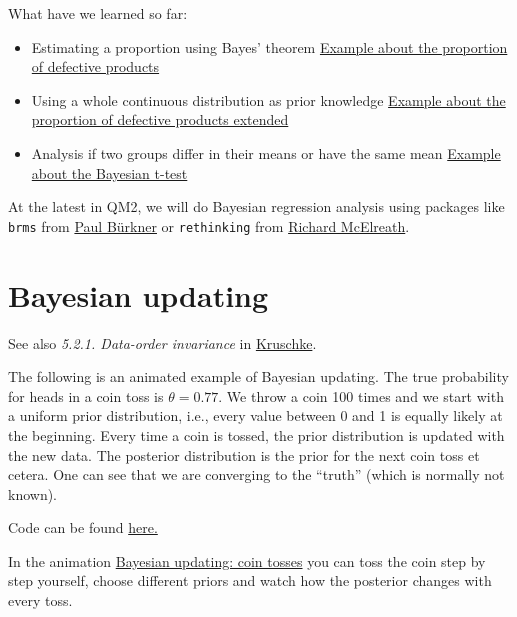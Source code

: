 \documentclass[
]{book}
\begin{document}
What have we learned so far:

\begin{itemize}
\item
  Estimating a proportion using Bayes' theorem \hyperref[example_defective_products]{Example about the proportion of defective products}
\item
  Using a whole continuous distribution as prior knowledge \hyperref[example_defective_products_extended]{Example about the proportion of defective products extended}
\item
  Analysis if two groups differ in their means or have the same mean \hyperref[bayesian_t_test]{Example about the Bayesian t-test}
\end{itemize}

At the latest in QM2, we will do Bayesian regression analysis using packages like \texttt{brms} from
\href{https://www.tu-dortmund.de/universitaet/neuberufene-professorinnen/prof-paul-christian-buerkner/}{Paul Bürkner} or
\texttt{rethinking} from \href{https://www.eva.mpg.de/ecology/staff/richard-mcelreath/}{Richard McElreath}.

\section{Bayesian updating}\label{bayesian-updating}

See also \emph{5.2.1. Data-order invariance} in \href{https://nyu-cdsc.github.io/learningr/assets/kruschke_bayesian_in_R.pdf}{Kruschke}.

The following is an animated example of Bayesian updating.
The true probability for heads in a coin toss is \(\theta = 0.77\).
We throw a coin 100 times and we start with a uniform prior distribution, i.e.,
every value between 0 and 1 is equally likely at the beginning.
Every time a coin is tossed, the prior distribution is updated with the new data.
The posterior distribution is the prior for the next coin toss et cetera.
One can see that we are converging to the ``truth'' (which is normally not known).

Code can be found \href{https://github.com/jdegenfellner/Script_QM1_ZHAW/blob/main/R_codes_with_long_compute_time/posterior.R}{here.}

In the animation \href{https://jdegenfellner.github.io/Script_QM1_ZHAW/animations/22_Bayes_Updating_Muenzwurf.html}{Bayesian updating: coin tosses}
you can toss the coin step by step yourself, choose different priors and watch how the posterior changes with every toss.
\end{document}
